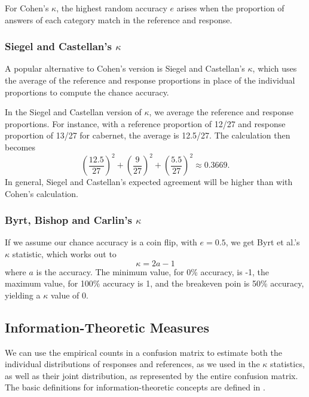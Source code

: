For Cohen's $\kappa$, the highest random accuracy $e$ arises when the
proportion of answers of each category match in the reference and response.

\subsubsection{Siegel and Castellan's $\kappa$}

A popular alternative to Cohen's version is Siegel and Castellan's
$\kappa$, which uses the average of the reference and response
proportions in place of the individual proportions to compute the
chance accuracy.

In the Siegel and Castellan version of $\kappa$, we average the
reference and response proportions.  For instance, with a reference
proportion of 12/27 and response proportion of 13/27 for cabernet,
the average is 12.5/27. The calculation then becomes
%
\begin{equation}
\left( \frac{12.5}{27} \right)^2
+ \left( \frac{9}{27} \right)^2
+ \left( \frac{5.5}{27} \right)^2
\approx 0.3669.
\end{equation}
%
In general, Siegel and Castellan's expected agreement will be higher
than with Cohen's calculation.


\subsubsection{Byrt, Bishop and Carlin's $\kappa$}

If we assume our chance accuracy is a coin flip, with $e = 0.5$, 
we get Byrt et al.'s $\kappa$ statistic, which works out to
%
\begin{equation}
\kappa = 2 a - 1
\end{equation}
%
where $a$ is the accuracy.  The minimum value, for 0\% accuracy, is
-1, the maximum value, for 100\% accuracy is 1, and the breakeven poin
is 50\% accuracy, yielding a $\kappa$ value of 0.


\subsection{Information-Theoretic Measures}

We can use the empirical counts in a confusion matrix to estimate both
the individual distributions of responses and references, as we used
in the $\kappa$ statistics, as well as their joint distribution, as
represented by the entire confusion matrix.  The basic definitions for
information-theoretic concepts are defined in
.

